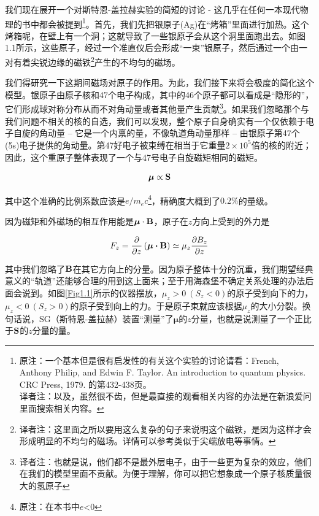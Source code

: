\documentclass[UTF8,twoside]{ctexart}
\begin{document}
\noindent 我们现在展开一个对斯特恩-盖拉赫实验的简短的讨论 - 这几乎在任何一本现代物理的书中都会被提到\footnote{原注：一个基本但是很有启发性的有关这个实验的讨论请看：French, Anthony Philip, and Edwin F. Taylor. An introduction to quantum physics. CRC Press, 1979. 的第432-438页。\\ 译者注：以及，虽然很不齿，但是最直接的观看相关内容的办法是在新浪爱问里面搜索相关内容。 }。首先，我们先把银原子(Ag)在“烤箱”里面进行加热。这个烤箱呢，在壁上有一个洞；这就导致了一些银原子会从这个洞里面跑出去。如图1.1所示，这些原子，经过一个准直仪后会形成“一束”银原子，然后通过一个由一对有着尖锐边缘的磁铁\footnote{译者注：这里面之所以要用这么复杂的句子来说明这个磁铁，是因为这样才会形成明显的不均匀的磁场。详情可以参考类似于尖端放电等事情。}产生的不均匀的磁场。

我们得研究一下这期间磁场对原子的作用。为此，我们接下来将会极度的简化这个模型。银原子由原子核和47个电子构成，其中的46个原子都可以看成是“隐形的”，它们形成球对称分布从而不对角动量或者其他量产生贡献\footnote{译者注：也就是说，他们都不是最外层电子，由于一些更为复杂的效应，他们在我们的模型里面不贡献。为便于理解，你可以把它想象成一个原子核质量很大的氢原子}。如果我们忽略那个与我们问题不相关的核的自选，我们可以发现，整个原子自身确实有一个仅依赖于电子自旋的角动量 -- 它是一个内禀的量，不像轨道角动量那样 -- 由银原子第47个(5s)电子提供的角动量。第47好电子被束缚在相当于它重量$2\times 10^5$倍的核的附近；因此，这个重原子整体表现了一个与47号电子自旋磁矩相同的磁矩。

\begin{equation}
{\bm{\mu}} \propto {\bf S}
\end{equation}

\noindent 其中这个准确的比例系数应该是$e/m_e c$\footnote{原注：在本书中$e$<0}，精确度大概到了$0.2\%$的量级。

因为磁矩和外磁场的相互作用能是${\bm\mu \cdot \bf B}$，原子在$z$方向上受到的外力是

\begin{equation}
F_z = \frac{\partial}{\partial z}\left(\bm{ \mu \cdot {\bf B}} \right) \simeq \mu_z \frac{\partial B_z}{\partial z}
\end{equation}

\noindent 其中我们忽略了$\bf B$在其它方向上的分量。因为原子整体十分的沉重，我们期望经典意义的“轨道”还能够合理的用到这上面来；至于用海森堡不确定关系处理的办法后面会说到。如图{\ref{Fig1.1}}所示的仪器摆放，$\mu_z > 0\ \left(S_z < 0\right)$的原子受到向下的力，$\mu_z < 0\ \left(S_z > 0\right)$的原子受到向上的力。于是原子束就应该根据$\mu_z$的大小分裂。换句话说，SG（斯特恩-盖拉赫）装置“测量”了$\bm \mu$的$z$分量，也就是说测量了一个正比于$\bf S$的$z$分量的量。
\end{document}
